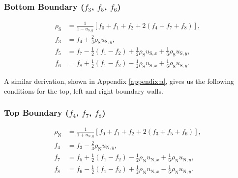 \documentclass[a4paper, 11pt]{report}
\begin{document}
\subsubsection*{Bottom Boundary ($f_3$, $f_5$, $f_6$)}
\vspace{-5mm}
\begin{subequations}
\begin{align}
    \rho_\mathrm{S} &= \frac{1}{1-u_{\mathrm{S},y}} \left[ f_0 + f_1 + f_2 + 2(f_4 + f_7 + f_8)\right], \\
    f_3 &= f_4 + \frac{2}{3}\rho_\mathrm{S}u_{\mathrm{S},y}, \\
    f_5 &= f_7 - \frac{1}{2}(f_1-f_2) + \frac{1}{2}\rho_\mathrm{S}u_{\mathrm{S},x} + \frac{1}{6}\rho_\mathrm{S}u_{\mathrm{S},y}, \\
    f_6 &= f_8 + \frac{1}{2}(f_1-f_2) - \frac{1}{2}\rho_\mathrm{S}u_{\mathrm{S},x} + \frac{1}{6}\rho_\mathrm{S}u_{\mathrm{S},y}.
\end{align}
\end{subequations}

A similar derivation, shown in Appendix \ref{appendix:a}, gives us the following conditions for the top, left and right boundary walls.

\subsubsection*{Top Boundary ($f_4$, $f_7$, $f_8$)}
\vspace{-5mm}
\begin{subequations} \label{eq:3.53}
\begin{align}
    \rho_\mathrm{N} &= \frac{1}{1+u_{\mathrm{N},y}} \left[ f_0 + f_1 + f_2 + 2(f_3 + f_5 + f_6)\right], \label{eq:3.53a}\\
    f_4 &= f_3 - \frac{2}{3}\rho_\mathrm{N}u_{\mathrm{N},y}, \label{eq:3.53b} \\
    f_7 &= f_5 + \frac{1}{2}(f_1-f_2) - \frac{1}{2}\rho_\mathrm{N}u_{\mathrm{N},x} + \frac{1}{6}\rho_\mathrm{N}u_{\mathrm{N},y}, \label{eq:3.53c}\\
    f_8 &= f_6 - \frac{1}{2}(f_1-f_2) + \frac{1}{2}\rho_\mathrm{N}u_{\mathrm{N},x} - \frac{1}{6}\rho_\mathrm{N}u_{\mathrm{N},y}.\label{eq:3.53d}
\end{align}
\end{subequations}
\end{document}
